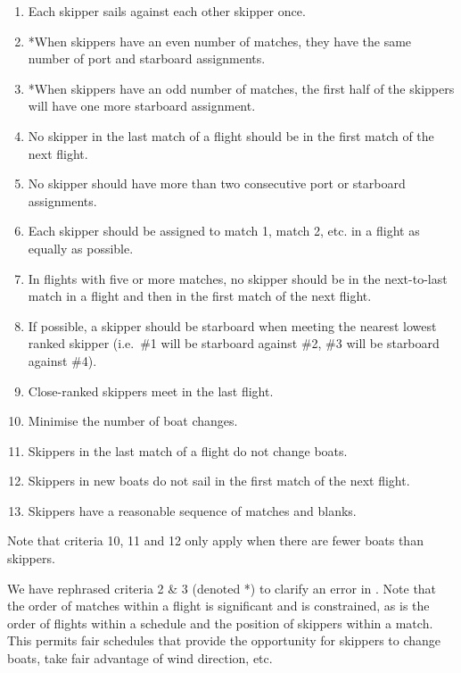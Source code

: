 \documentclass{llncs}
\begin{document}
\begin{framed}
\begin{enumerate}
\item Each skipper sails against each other skipper once.
\item *When skippers have an even number of matches, they have the same number of port and starboard assignments.
\item *When skippers have an odd number of matches, the first half of the skippers
    will have one more starboard assignment.
\item No skipper in the last match of a flight should be in the first match of
    the next flight.
\item No skipper should have more than two consecutive port or starboard
    assignments.
\item Each skipper should be assigned to match 1, match 2, etc. in a flight as
    equally as possible.
\item In flights with five or more matches, no skipper should be in the
    next-to-last match in a flight and then in the first match of the next
    flight.
\item If possible, a skipper should be starboard when meeting the nearest
    lowest ranked skipper (i.e.\ \#1 will be starboard against \#2, \#3 will be
    starboard against \#4).
\item Close-ranked skippers meet in the last flight.
\item Minimise the number of boat changes.
\item Skippers in the last match of a flight do not change boats.
\item Skippers in new boats do not sail in the first match of the next flight.
\item Skippers have a reasonable sequence of matches and blanks.
\end{enumerate}
Note that criteria 10, 11 and 12 only apply when there are fewer boats than
skippers.
\end{framed}

We have rephrased criteria 2 \& 3 (denoted *) to clarify an error in \cite{isaf}. Note that the order of matches within a flight is significant and is constrained, as is the order of flights within a schedule and the position of skippers within a match. This permits fair schedules that provide the opportunity for skippers to change boats, take fair advantage of wind direction, etc. 
\end{document}
